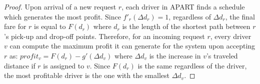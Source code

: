 \begin{proof}
Upon arrival of a new request $r$, each driver in APART finds a schedule which generates the most profit. Since $f'_r(\Delta d_r) = 1$, regardless of $\Delta d_r$, the final fare for $r$ is equal to $F(d_r)$ where $d_r$ is the length of the shortest path between $r$'s pick-up and drop-off points. Therefore, for an incoming request $r$, every driver $v$ can compute the maximum profit it can generate for the system upon accepting $r$ as: $profit_v = F(d_r) - g'(\Delta d_v)$ where $\Delta d_v$ is the increase in $v$'s traveled distance if $r$ is assigned to $v$. Since $F(d_r)$ is the same regardless of the driver, the most profitable driver is the one with the smallest $\Delta d_v$.
\end{proof}